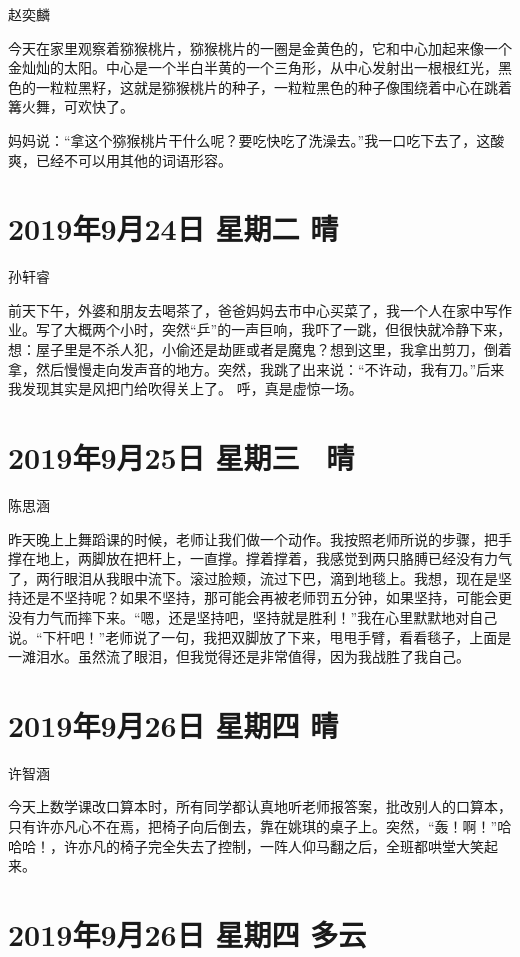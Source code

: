 赵奕麟

今天在家里观察着猕猴桃片，猕猴桃片的一圈是金黄色的，它和中心加起来像一个金灿灿的太阳。中心是一个半白半黄的一个三角形，从中心发射出一根根红光，黑色的一粒粒黑籽，这就是猕猴桃片的种子，一粒粒黑色的种子像围绕着中心在跳着篝火舞，可欢快了。

妈妈说：``拿这个猕猴桃片干什么呢？要吃快吃了洗澡去。''我一口吃下去了，这酸爽，已经不可以用其他的词语形容。

\section{2019年9月24日 星期二 晴}

孙轩睿

前天下午，外婆和朋友去喝茶了，爸爸妈妈去市中心买菜了，我一个人在家中写作业。写了大概两个小时，突然``乒''的一声巨响，我吓了一跳，但很快就冷静下来，想：屋子里是不杀人犯，小偷还是劫匪或者是魔鬼？想到这里，我拿出剪刀，倒着拿，然后慢慢走向发声音的地方。突然，我跳了出来说：``不许动，我有刀。''后来我发现其实是风把门给吹得关上了。
呼，真是虚惊一场。

\section{2019年9月25日 星期三~ 晴}

陈思涵

昨天晚上上舞蹈课的时候，老师让我们做一个动作。我按照老师所说的步骤，把手撑在地上，两脚放在把杆上，一直撑。撑着撑着，我感觉到两只胳膊已经没有力气了，两行眼泪从我眼中流下。滚过脸颊，流过下巴，滴到地毯上。我想，现在是坚持还是不坚持呢？如果不坚持，那可能会再被老师罚五分钟，如果坚持，可能会更没有力气而摔下来。``嗯，还是坚持吧，坚持就是胜利！''我在心里默默地对自己说。``下杆吧！''老师说了一句，我把双脚放了下来，甩甩手臂，看看毯子，上面是一滩泪水。虽然流了眼泪，但我觉得还是非常值得，因为我战胜了我自己。

\section{2019年9月26日 星期四 晴}

许智涵

今天上数学课改口算本时，所有同学都认真地听老师报答案，批改别人的口算本，只有许亦凡心不在焉，把椅子向后倒去，靠在姚琪的桌子上。突然，``轰！啊！''哈哈哈！，许亦凡的椅子完全失去了控制，一阵人仰马翻之后，全班都哄堂大笑起来。

\section{2019年9月26日 星期四 多云}

